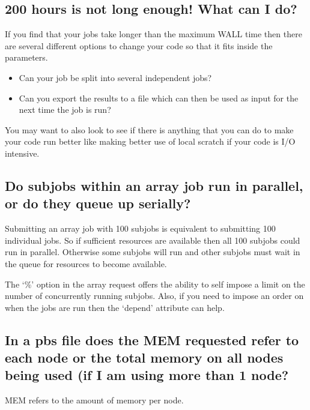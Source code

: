\documentclass[letterpaper,10pt,english]{sphinxmanual}
\begin{document}
\subsection{200 hours is not long enough! What can I do?}
\label{\detokenize{faq:hours-is-not-long-enough-what-can-i-do}}
If you find that your jobs take longer than the maximum WALL time then there are several different options to change your code so that it fits inside the parameters.
\begin{itemize}
\item {} 
Can your job be split into several independent jobs?

\item {} 
Can you export the results to a file which can then be used as input for the next time the job is run?

\end{itemize}

You may want to also look to see if there is anything that you can do to make your code run better like making better use of local scratch if your code is I/O intensive.


\subsection{Do sub\sphinxhyphen{}jobs within an array job run in parallel, or do they queue up serially?}
\label{\detokenize{faq:do-sub-jobs-within-an-array-job-run-in-parallel-or-do-they-queue-up-serially}}
Submitting an array job with 100 sub\sphinxhyphen{}jobs is equivalent to submitting 100 individual jobs. So if sufficient resources are available then all 100 sub\sphinxhyphen{}jobs could run in parallel. Otherwise some sub\sphinxhyphen{}jobs will run and other sub\sphinxhyphen{}jobs must wait in the queue for resources to become available.

The ‘\%’ option in the array request offers the ability to self impose a limit on the number of concurrently running sub\sphinxhyphen{}jobs. Also, if you need to impose an order on when the jobs are run then the ‘depend’ attribute can help.


\subsection{In a pbs file does the MEM requested refer to each node or the total memory on all nodes being used (if I am using more than 1 node?}
\label{\detokenize{faq:in-a-pbs-file-does-the-mem-requested-refer-to-each-node-or-the-total-memory-on-all-nodes-being-used-if-i-am-using-more-than-1-node}}
MEM refers to the amount of memory per node.
\end{document}
